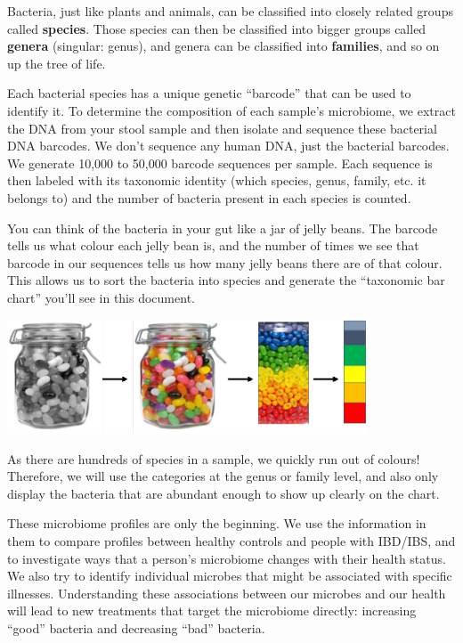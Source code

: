 \documentclass[
]{article}
\begin{document}
Bacteria, just like plants and animals, can be classified into closely
related groups called \textbf{species}. Those species can then be
classified into bigger groups called \textbf{genera} (singular: genus),
and genera can be classified into \textbf{families}, and so on up the
tree of life.

Each bacterial species has a unique genetic ``barcode'' that can be used
to identify it. To determine the composition of each sample's
microbiome, we extract the DNA from your stool sample and then isolate
and sequence these bacterial DNA barcodes. We don't sequence any human
DNA, just the bacterial barcodes. We generate 10,000 to 50,000 barcode
sequences per sample. Each sequence is then labeled with its taxonomic
identity (which species, genus, family, etc. it belongs to) and the
number of bacteria present in each species is counted.

You can think of the bacteria in your gut like a jar of jelly beans. The
barcode tells us what colour each jelly bean is, and the number of times
we see that barcode in our sequences tells us how many jelly beans there
are of that colour. This allows us to sort the bacteria into species and
generate the ``taxonomic bar chart'' you'll see in this document.

\begin{center}
\includegraphics[width=0.8\textwidth]{img/jellybeans.png}
\end{center}

As there are hundreds of species in a sample, we quickly run out of
colours! Therefore, we will use the categories at the genus or family
level, and also only display the bacteria that are abundant enough to
show up clearly on the chart.

These microbiome profiles are only the beginning. We use the information
in them to compare profiles between healthy controls and people with
IBD/IBS, and to investigate ways that a person's microbiome changes with
their health status. We also try to identify individual microbes that
might be associated with specific illnesses. Understanding these
associations between our microbes and our health will lead to new
treatments that target the microbiome directly: increasing ``good''
bacteria and decreasing ``bad'' bacteria.
\end{document}
